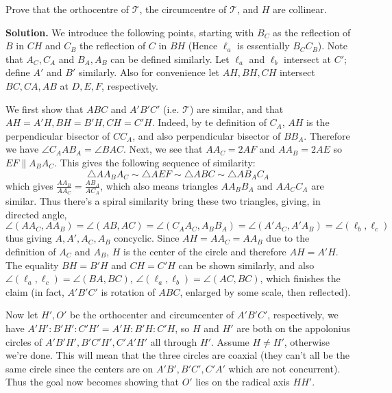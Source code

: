 \documentclass[11pt,a4paper]{article}
\begin{document}
\begin{enumerate}
    	Prove that the orthocentre of $\mathcal T$, the circumcentre of $\mathcal T$, and $H$ are collinear.
    	
    	\textbf{Solution.} 
    	We introduce the following points, starting with $B_C$ as the reflection of $B$ in $CH$ 
    	and $C_B$ the reflection of $C$ in $BH$ 
    	(Hence $\ell_a$ is essentially $B_CC_B$). 
    	Note that $A_C, C_A$ and $B_A, A_B$ can be defined similarly. 
    	Let $\ell_a$ and $\ell_b$ intersect at $C'$; define $A'$ and $B'$ similarly. 
    	Also for convenience let $AH, BH, CH$ intersect $BC, CA, AB$ at $D, E, F$, respectively. 
    	
    	We first show that $ABC$ and $A'B'C'$ (i.e. $\mathcal T$) are similar, 
    	and that $AH=A'H, BH=B'H, CH=C'H$. 
    	Indeed, by te definition of $C_A$, $AH$ is the perpendicular bisector of $CC_A$, 
    	and also perpendicular bisector of $BB_A$. 
    	Therefore we have $\angle C_AAB_A = \angle BAC$. 
    	Next, we see that $AA_C=2AF$ and $AA_B = 2AE$ so $EF\parallel A_BA_C$. 
    	This gives the following sequence of similarity: 
    	\[
    	\triangle AA_BA_C\sim \triangle AEF\sim \triangle ABC\sim \triangle AB_AC_A
    	\]
    	which gives $\frac{AA_B}{AA_C}=\frac{AB_A}{AC_A}$, 
    	which also means triangles $AA_BB_A$ and $AA_CC_A$ are similar. 
    	Thus there's a spiral similarity bring these two triangles, giving, 
    	in directed angle, 
    	\[
    	\angle(AA_C, AA_B)=\angle (AB, AC) = \angle (C_AA_C, A_BB_A)
    	=\angle(A'A_C, A'A_B)
    	=\angle(\ell_b, \ell_c)
    	\]
    	thus giving $A, A', A_C, A_B$ concyclic. 
    	Since $AH=AA_C=AA_B$ due to the definition of $A_C$ and $A_B$, 
    	$H$ is the center of the circle and therefore $AH=A'H$. 
    	The equality $BH=B'H$ and $CH=C'H$ can be shown similarly, 
    	and also $\angle(\ell_a, \ell_c) = \angle(BA, BC)$, 
    	$\angle(\ell_a, \ell_b)=\angle(AC, BC)$, 
    	which finishes the claim 
    	(in fact, $A'B'C'$ is rotation of $ABC$, enlarged by some scale, then reflected). 
    	
    	Now let $H', O'$ be the orthocenter and circumcenter of $A'B'C'$, respectively,  
    	we have $A'H':B'H':C'H'=A'H:B'H:C'H$, 
    	so $H$ and $H'$ are both on the appolonius circles of $A'B'H', B'C'H', C'A'H'$ all through $H'$. 
    	Assume $H\neq H'$, otherwise we're done. 
    	This will mean that the three circles are coaxial (they can't all be the same circle since the centers are on $A'B', B'C', C'A'$ which are not concurrent). 
    	Thus the goal now becomes showing that $O'$ lies on the radical axis $HH'$. 
    	

\end{enumerate}
\end{document}
